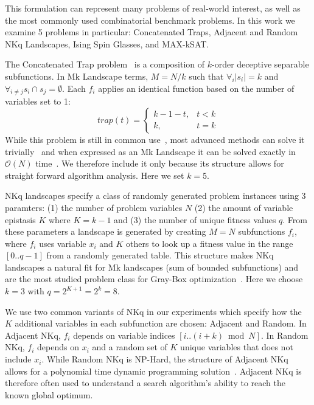 \documentclass[runningheads,a4paper]{llncs}
\newcommand{\BigO}[1]{$\mathcal{O}{(#1)}$}
\begin{document}
This formulation can represent many problems of real-world interest, as well as
the most commonly used combinatorial benchmark problems. In this work we
examine 5 problems in particular: Concatenated Traps, Adjacent and Random NKq Landscapes,
Ising Spin Glasses, and MAX-kSAT.

The Concatenated Trap problem~\cite{deb:1992:trap} is a composition of $k$-order deceptive
separable subfunctions. In Mk Landscape terms, $M=N/k$ such that $\forall_i |s_i| = k$ and
$\forall_{i \neq j} s_i \cap s_j = \emptyset$. Each $f_i$ applies an identical function based
on the number of variables set to 1:
\begin{equation}
   trap(t) = \left\{
     \begin{array}{rl}
       k-1-t, &  t<k\\
       k,   &  t = k
     \end{array}
   \right.
  \label{eq-trap}
\end{equation}
While this problem is still in common use~\cite{hsu:2015:dsmgaII,inoue:2015:adaptivep3},
most advanced methods can solve it trivially~\cite{goldman:2012:ltga} and when expressed
as an Mk Landscape it can be solved exactly in \BigO{N} time~\cite{whitley:2015:mk}.
We therefore include it only because its structure allows for straight forward algorithm analysis.
Here we set $k=5$.

NKq landscapes specify a class of randomly generated problem instances using 3 paramters:
(1) the number of problem variables $N$ (2) the amount of variable epistasis $K$ where $K=k-1$
and (3) the number of unique fitness values $q$. From these parameters a landscape is generated
by creating $M=N$ subfunctions $f_i$, where $f_i$ uses variable $x_i$ and $K$ others to look up
a fitness value in the range $[0..q-1]$ from a randomly generated table. This structure
makes NKq landscapes a natural fit for Mk landscapes (sum of bounded subfunctions)
and are the most studied problem class for Gray-Box
optimization~\cite{whitley:2012:constant,chicano:2014:ball,goldman:2015:GBO,tintos:2015:partitioncross,ochoa:2015:crossovernetworks,whitley:2015:mk}.
Here we choose $k=3$ with $q=2^{K+1}=2^{k}=8$.

We use two common variants of NKq in our experiments which specify how the $K$ additional
variables in each subfunction are chosen: Adjacent and Random. In Adjacent NKq, $f_i$ depends
on variable indices $[i..(i+k) \bmod N]$. In Random NKq, $f_i$ depends on $x_i$ and a random
set of $K$ unique variables that does not include $x_i$. While Random NKq is NP-Hard,
the structure of Adjacent NKq allows for a polynomial time dynamic programming solution~\cite{wright:2000:solvingnk}.
Adjacent NKq is therefore often used to understand a search algorithm's ability to reach the known global
optimum.
\end{document}
